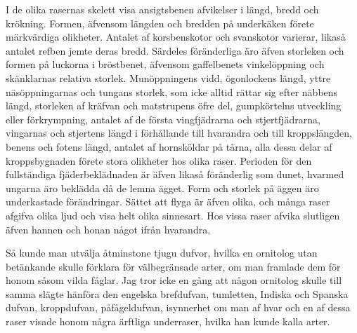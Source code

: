I de olika rasernas skelett visa ansigtsbenen afvikelser i längd, bredd och krökning. Formen, äfvensom längden och bredden på underkäken förete märkvärdiga olikheter. Antalet af korsbenskotor och svanskotor varierar, likaså antalet refben jemte deras bredd. Särdeles föränderliga äro äfven storleken och formen på luckorna i bröstbenet, äfvensom gaffelbenets vinkelöppning och skänklarnas relativa storlek. Munöppningens vidd, ögonlockens längd, yttre näsöppningarnas och tungans storlek, som icke alltid rättar sig efter näbbens längd, storleken af kräfvan och matstrupens öfre del, gumpkörtelns utveckling eller förkrympning, antalet af de första vingfjädrarna och stjertfjädrarna, vingarnas och stjertens längd i förhållande till hvarandra och till kroppslängden, benens och fotens längd, antalet af hornsköldar på tårna, alla dessa delar af kroppsbygnaden förete stora olikheter hos olika raser. Perioden för den fullständiga fjäderbeklädnaden är äfven likaså föränderlig som dunet, hvarmed ungarna äro beklädda då de lemna ägget. Form och storlek på äggen äro underkastade förändringar. Sättet att flyga är äfven olika, och många raser afgifva olika ljud och visa helt olika sinnesart. Hos vissa raser afvika slutligen äfven hannen och honan något ifrån hvarandra.

Så kunde man utvälja åtminstone tjugu dufvor, hvilka en ornitolog utan betänkande skulle förklara för välbegränsade arter, om man framlade dem för honom såsom vilda fåglar. Jag tror icke en gång att någon ornitolog skulle till samma slägte hänföra den engelska brefdufvan, tumletten, Indiska och Spanska dufvan, kroppdufvan, påfågeldufvan, isynnerhet om man af hvar och en af dessa raser visade honom några ärftliga underraser, hvilka han kunde kalla arter.

